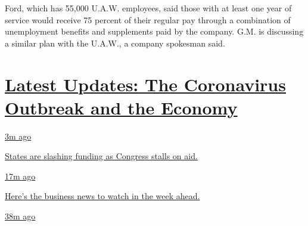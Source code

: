 Ford, which has 55,000 U.A.W. employees, said those with at least one
year of service would receive 75 percent of their regular pay through a
combination of unemployment benefits and supplements paid by the
company. G.M. is discussing a similar plan with the U.A.W., a company
spokesman said.

\hypertarget{latest-updates-the-coronavirus-outbreak-and-the-economy}{%
\section{\texorpdfstring{\href{https://www.nytimes3xbfgragh.onion/live/2020/09/08/business/stock-market-today-coronavirus?action=click\&pgtype=Article\&state=default\&region=MAIN_CONTENT_1\&context=storylines_live_updates}{Latest
Updates: The Coronavirus Outbreak and the
Economy}}{Latest Updates: The Coronavirus Outbreak and the Economy}}\label{latest-updates-the-coronavirus-outbreak-and-the-economy}}

\href{https://www.nytimes3xbfgragh.onion/live/2020/09/08/business/stock-market-today-coronavirus?action=click\&pgtype=Article\&state=default\&region=MAIN_CONTENT_1\&context=storylines_live_updates\#states-are-slashing-funding-as-congress-stalls-on-aid}{3m
ago}

\href{https://www.nytimes3xbfgragh.onion/live/2020/09/08/business/stock-market-today-coronavirus?action=click\&pgtype=Article\&state=default\&region=MAIN_CONTENT_1\&context=storylines_live_updates\#states-are-slashing-funding-as-congress-stalls-on-aid}{States
are slashing funding as Congress stalls on aid.}

\href{https://www.nytimes3xbfgragh.onion/live/2020/09/08/business/stock-market-today-coronavirus?action=click\&pgtype=Article\&state=default\&region=MAIN_CONTENT_1\&context=storylines_live_updates\#heres-the-business-news-to-watch-in-the-week-ahead}{17m
ago}

\href{https://www.nytimes3xbfgragh.onion/live/2020/09/08/business/stock-market-today-coronavirus?action=click\&pgtype=Article\&state=default\&region=MAIN_CONTENT_1\&context=storylines_live_updates\#heres-the-business-news-to-watch-in-the-week-ahead}{Here's
the business news to watch in the week ahead.}

\href{https://www.nytimes3xbfgragh.onion/live/2020/09/08/business/stock-market-today-coronavirus?action=click\&pgtype=Article\&state=default\&region=MAIN_CONTENT_1\&context=storylines_live_updates\#elon-musk-says-the-new-electric-vw-is-pretty-good-for-a-non-sporty-car-that-is}{38m
ago}

